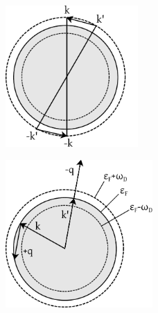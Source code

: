\begin{figure}[H]
  \centering
  \includegraphics[width=0.45\textwidth]{img/pp181-200_coopermodel.pdf}
\end{figure}


\begin{figure}[H]
  \centering
  \includegraphics[width=0.5\textwidth]{img/pp181-200_cooperlimits.pdf}
\end{figure}
